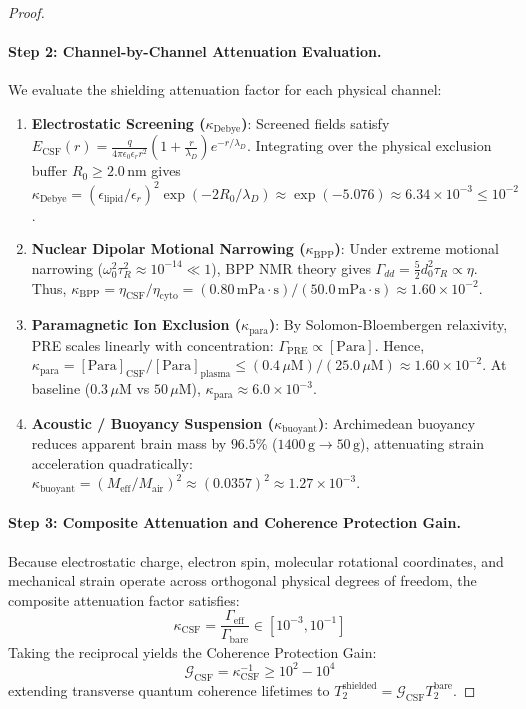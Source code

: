 \documentclass[10pt,twocolumn,3p]{article}
\begin{document}
\begin{proof}
\paragraph{Step 2: Channel-by-Channel Attenuation Evaluation.}
We evaluate the shielding attenuation factor for each physical channel:
\begin{enumerate}
    \item \textbf{Electrostatic Screening ($\kappa_{\text{Debye}}$)}: Screened fields satisfy $E_{\text{CSF}}(r) = \frac{q}{4\pi\epsilon_0\epsilon_r r^2}(1 + \frac{r}{\lambda_D})e^{-r/\lambda_D}$. Integrating over the physical exclusion buffer $R_0 \ge 2.0\,\text{nm}$ gives $\kappa_{\text{Debye}} = (\epsilon_{\text{lipid}}/\epsilon_r)^2 \exp(-2R_0/\lambda_D) \approx \exp(-5.076) \approx 6.34 \times 10^{-3} \le 10^{-2}$.
    \item \textbf{Nuclear Dipolar Motional Narrowing ($\kappa_{\text{BPP}}$)}: Under extreme motional narrowing ($\omega_0^2 \tau_R^2 \approx 10^{-14} \ll 1$), BPP NMR theory gives $\Gamma_{dd} = \frac{5}{2} d_0^2 \tau_R \propto \eta$. Thus, $\kappa_{\text{BPP}} = \eta_{\text{CSF}}/\eta_{\text{cyto}} = (0.80\,\text{mPa}\cdot\text{s}) / (50.0\,\text{mPa}\cdot\text{s}) \approx 1.60 \times 10^{-2}$.
    \item \textbf{Paramagnetic Ion Exclusion ($\kappa_{\text{para}}$)}: By Solomon-Bloembergen relaxivity, PRE scales linearly with concentration: $\Gamma_{\text{PRE}} \propto [\text{Para}]$. Hence, $\kappa_{\text{para}} = [\text{Para}]_{\text{CSF}} / [\text{Para}]_{\text{plasma}} \le (0.4\,\mu\text{M}) / (25.0\,\mu\text{M}) \approx 1.60 \times 10^{-2}$. At baseline ($0.3\,\mu\text{M}$ vs $50\,\mu\text{M}$), $\kappa_{\text{para}} \approx 6.0 \times 10^{-3}$.
    \item \textbf{Acoustic / Buoyancy Suspension ($\kappa_{\text{buoyant}}$)}: Archimedean buoyancy reduces apparent brain mass by $96.5\%$ ($1400\,\text{g} \to 50\,\text{g}$), attenuating strain acceleration quadratically: $\kappa_{\text{buoyant}} = (M_{\text{eff}}/M_{\text{air}})^2 \approx (0.0357)^2 \approx 1.27 \times 10^{-3}$.
\end{enumerate}

\paragraph{Step 3: Composite Attenuation and Coherence Protection Gain.}
Because electrostatic charge, electron spin, molecular rotational coordinates, and mechanical strain operate across orthogonal physical degrees of freedom, the composite attenuation factor satisfies:
\begin{equation}
    \kappa_{\text{CSF}} = \frac{\Gamma_{\text{eff}}}{\Gamma_{\text{bare}}} \in [10^{-3}, 10^{-1}]
\end{equation}
Taking the reciprocal yields the Coherence Protection Gain:
\begin{equation}
    \mathcal{G}_{\text{CSF}} = \kappa_{\text{CSF}}^{-1} \ge 10^2 - 10^4
\end{equation}
extending transverse quantum coherence lifetimes to $T_2^{\text{shielded}} = \mathcal{G}_{\text{CSF}} T_2^{\text{bare}}$.


\end{proof}
\end{document}

